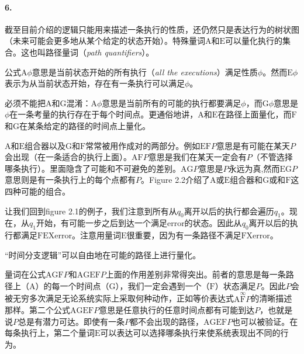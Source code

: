 \documentclass{book}
\begin{document}
    \paragraph{6.} 截至目前介绍的逻辑只能用来描述一条执行的性质，还仍然只是表达行为的树状图（未来可能会更多地从某个给定的状态开始）。特殊量词$\mathrm{A}$和$\mathrm{E}$可以量化执行的集合。这也叫路径量词（{\itshape path quantifiers}）。

    公式$\mathrm{A}\phi$意思是当前状态开始的所有执行（{\itshape all the executions}）满足性质$\phi$。然而$\mathrm{E}\phi$表示为从当前状态开始，存在有一条执行可以满足$\phi$。

    必须不能把$\mathrm{A}$和$\mathrm{G}$混淆：$\mathrm{A}\phi$意思是当前所有的可能的执行都要满足$\phi$，而$\mathrm{G}\phi$意思是$\phi$在一条考量的执行存在于每个时间点。更通俗地讲，$\mathrm{A}$和$\mathrm{E}$在路径上面量化，而$\mathrm{F}$和$\mathrm{G}$在某条给定的路径的时间点上量化。

    $\mathrm{A}$和$\mathrm{E}$组合器以及$\mathrm{G}$和$\mathrm{F}$常常被用作成对的两部分。例如$\mathrm{E}\mathrm{F}P$意思是有可能在某天$P$会出现（在一条适合的执行上面）。$\mathrm{A}\mathrm{F}P$意思是我们在某天一定会有$P$（不管选择哪条执行）。里面隐含了可能和不可避免的差别。$\mathrm{A}\mathrm{G}P$意思是$P$永远为真,然而$\mathrm{E}\mathrm{G}P$意思则是有一条执行上的每个点都有$P$。Figure 2.2介绍了$\mathrm{A}$或$\mathrm{E}$组合器和$\mathrm{G}$或和$\mathrm{F}$这四种可能的组合。

    让我们回到figure 2.1的例子，我们注意到所有从$q_0$离开以后的执行都会遍历$q_1$。现在，从$q_1$开始，有可能一步之后到达一个满足error的状态。因此从$q_0$离开以后的执行都满足$\mathrm{F}\mathrm{E}\mathrm{X}\text{error}$。注意用量词$\mathrm{E}$很重要，因为有一条路径不满足$\mathrm{F}\mathrm{X} \text{error}$。

    “时间分支逻辑”可以自由地在可能的路径上进行量化。

    量词在公式$\mathrm{A}\mathrm{G}\mathrm{F}P$和$\mathrm{A}\mathrm{G}\mathrm{E}\mathrm{F}P$上面的作用差别非常得突出。前者的意思是每一条路径上（$\mathrm{A}$）的每一个时间点（$\mathrm{G}$），我们一定会遇到一个（$\mathrm{F}$）状态满足$P$。因此$P$会被无穷多次满足无论系统实际上采取何种动作，正如等价表达式$\mathrm{A}\overset{\infty}{\mathrm{F}}P$的清晰描述那样。第二个公式$\mathrm{A}\mathrm{G}\mathrm{E}\mathrm{F}P$意思是任意执行的任意时间点都有可能到达$P$，也就是说$P$总是有潜力可达。即使有一条$P$都不会出现的路径，$\mathrm{A}\mathrm{G}\mathrm{E}\mathrm{F}P$也可以被验证。在每条执行上，第二个量词$\mathrm{E}$可以表达可以选择哪条执行来使系统表现出不同的行为。
\end{document}
